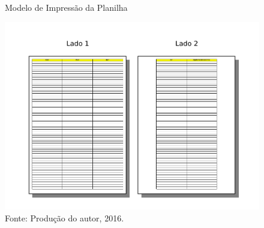 \documentclass[12pt]{article}
\begin{document}
\begin{figure}[ht]
\caption{Modelo de Impressão da Planilha}\label{fig:impressao}
\centering
\includegraphics[width=\textwidth,keepaspectratio]{figures/modelo-impressao.pdf}
\caption*{\footnotesize Fonte: Produção do autor, 2016.}
\end{figure}



\end{document}
